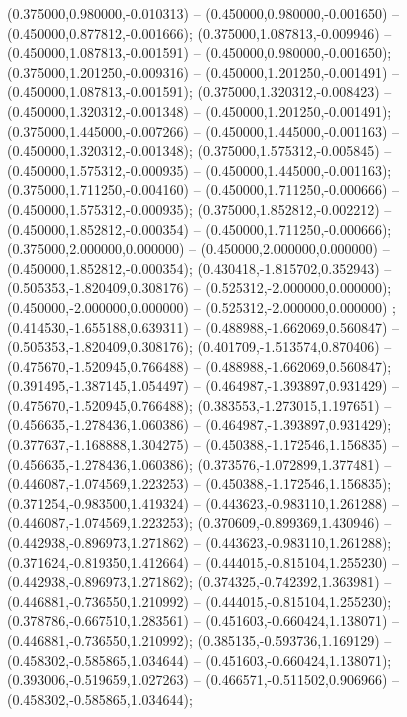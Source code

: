  (0.375000,0.980000,-0.010313) -- (0.450000,0.980000,-0.001650) -- (0.450000,0.877812,-0.001666);
 (0.375000,1.087813,-0.009946) -- (0.450000,1.087813,-0.001591) -- (0.450000,0.980000,-0.001650);
 (0.375000,1.201250,-0.009316) -- (0.450000,1.201250,-0.001491) -- (0.450000,1.087813,-0.001591);
 (0.375000,1.320312,-0.008423) -- (0.450000,1.320312,-0.001348) -- (0.450000,1.201250,-0.001491);
 (0.375000,1.445000,-0.007266) -- (0.450000,1.445000,-0.001163) -- (0.450000,1.320312,-0.001348);
 (0.375000,1.575312,-0.005845) -- (0.450000,1.575312,-0.000935) -- (0.450000,1.445000,-0.001163);
 (0.375000,1.711250,-0.004160) -- (0.450000,1.711250,-0.000666) -- (0.450000,1.575312,-0.000935);
 (0.375000,1.852812,-0.002212) -- (0.450000,1.852812,-0.000354) -- (0.450000,1.711250,-0.000666);
 (0.375000,2.000000,0.000000) -- (0.450000,2.000000,0.000000) -- (0.450000,1.852812,-0.000354);
 (0.430418,-1.815702,0.352943) -- (0.505353,-1.820409,0.308176) -- (0.525312,-2.000000,0.000000);
 (0.450000,-2.000000,0.000000) -- (0.525312,-2.000000,0.000000) ;
 (0.414530,-1.655188,0.639311) -- (0.488988,-1.662069,0.560847) -- (0.505353,-1.820409,0.308176);
 (0.401709,-1.513574,0.870406) -- (0.475670,-1.520945,0.766488) -- (0.488988,-1.662069,0.560847);
 (0.391495,-1.387145,1.054497) -- (0.464987,-1.393897,0.931429) -- (0.475670,-1.520945,0.766488);
 (0.383553,-1.273015,1.197651) -- (0.456635,-1.278436,1.060386) -- (0.464987,-1.393897,0.931429);
 (0.377637,-1.168888,1.304275) -- (0.450388,-1.172546,1.156835) -- (0.456635,-1.278436,1.060386);
 (0.373576,-1.072899,1.377481) -- (0.446087,-1.074569,1.223253) -- (0.450388,-1.172546,1.156835);
 (0.371254,-0.983500,1.419324) -- (0.443623,-0.983110,1.261288) -- (0.446087,-1.074569,1.223253);
 (0.370609,-0.899369,1.430946) -- (0.442938,-0.896973,1.271862) -- (0.443623,-0.983110,1.261288);
 (0.371624,-0.819350,1.412664) -- (0.444015,-0.815104,1.255230) -- (0.442938,-0.896973,1.271862);
 (0.374325,-0.742392,1.363981) -- (0.446881,-0.736550,1.210992) -- (0.444015,-0.815104,1.255230);
 (0.378786,-0.667510,1.283561) -- (0.451603,-0.660424,1.138071) -- (0.446881,-0.736550,1.210992);
 (0.385135,-0.593736,1.169129) -- (0.458302,-0.585865,1.034644) -- (0.451603,-0.660424,1.138071);
 (0.393006,-0.519659,1.027263) -- (0.466571,-0.511502,0.906966) -- (0.458302,-0.585865,1.034644);
